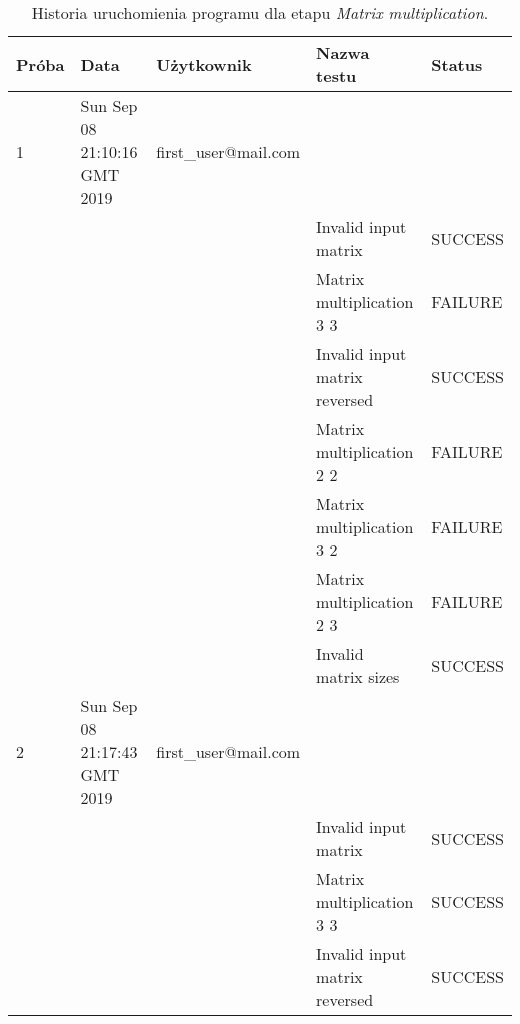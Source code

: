\begin{center}

    \scriptsize

\begin{longtable}{|l|l|l|l|l|}
    \caption{Historia uruchomienia programu dla etapu \textit{Matrix multiplication}.}
    \label{tab:matrix_multiplication} \\ \hline

    \hline
    \rowcolor[HTML]{EFEFEF}
    \textbf{Próba}  & \textbf{Data}                 & \textbf{Użytkownik}                   & \textbf{Nazwa testu}                     & \textbf{Status}  \\ \hline
    1     & Sun Sep 08 21:10:16 GMT 2019 & first\_user@mail.com &                               &         \\ \hline
    &                              &                                 & Invalid input matrix          & SUCCESS \\ \hline
    &                              &                                 & Matrix multiplication 3 3     & FAILURE \\ \hline
    &                              &                                 & Invalid input matrix reversed & SUCCESS \\ \hline
    &                              &                                 & Matrix multiplication 2 2     & FAILURE \\ \hline
    &                              &                                 & Matrix multiplication 3 2     & FAILURE \\ \hline
    &                              &                                 & Matrix multiplication 2 3     & FAILURE \\ \hline
    &                              &                                 & Invalid matrix sizes          & SUCCESS \\ \hline
    2     & Sun Sep 08 21:17:43 GMT 2019 & first\_user@mail.com &                               &         \\ \hline
    &                              &                                 & Invalid input matrix          & SUCCESS \\ \hline
    &                              &                                 & Matrix multiplication 3 3     & SUCCESS \\ \hline
    &                              &                                 & Invalid input matrix reversed & SUCCESS \\ \hline

\end{longtable}
\end{center}
